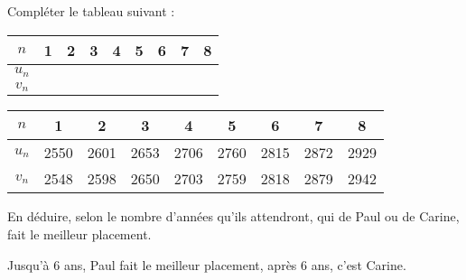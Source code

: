 \begin{questions}
	\question[1] Compléter le tableau suivant :
	
	\begin{center}
		
		\begin{tabular}{|@{$\quad $}c@{$\quad $}| @{$\qquad $}c@{$\qquad $} | @{$\qquad $}c@{$\qquad $} | @{$\qquad $}c@{$\qquad $} | @{$\qquad $}c@{$\qquad $} |@{$\qquad $}c@{$\qquad $} |@{$\qquad $}c@{$\qquad $} |@{$\qquad $}c@{$\qquad $}|@{$\qquad $}c@{$\qquad $}|}
			\hline
			$n$                           & 1 & 2 & 3 & 4 & 5 & 6 & 7 & 8 \\ \hline
			$u_n$ &   &   &   &   &   &   &   &   \\ \hline
			$v_n$ &   &   &   &   &   &   &   &   \\ \hline
		\end{tabular}
	\end{center}

	\begin{solution}
		\begin{small}
			
		\begin{center}
			
			\begin{tabular}{|@{$\quad $}c@{$\quad $}| @{\ }c@{\ } | @{\ }c@{\ } | @{\ }c@{\ } | @{\ }c@{\ } |@{\ }c@{\ } |@{\ }c@{\ } |@{\ }c@{\ }|@{\ }c@{\ }|}
				\hline
				$n$                           & 1 & 2 & 3 & 4 & 5 & 6 & 7 & 8 \\ \hline
				$u_n$ & 2550  & 2601  & 2653  & 2706  & 2760  & 2815  & 2872  & 2929  \\ \hline
				$v_n$ &  2548 &  2598 &  2650 &  2703 &  2759 &  2818 &  2879 &  2942 \\ \hline
			\end{tabular}
		\end{center}
		\end{small}
	\end{solution}
	
	\question[1] En déduire, selon le nombre d'années qu'ils attendront, qui de Paul ou de Carine, fait le meilleur placement.
	\begin{solution}
		Jusqu'à 6 ans, Paul fait le meilleur placement, après 6 ans, c'est Carine.
	\end{solution}
	
\end{questions}